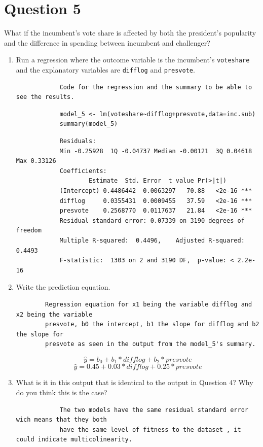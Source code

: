 \documentclass[12pt,letterpaper]{article}
\begin{document}
\section*{Question 5}
\noindent What if the incumbent's vote share is affected by both the president's popularity and the difference in spending between incumbent and challenger? 
	\begin{enumerate}
		\item Run a regression where the outcome variable is the incumbent's \texttt{voteshare} and the explanatory variables are \texttt{difflog} and \texttt{presvote}.
		\begin{verbatim}
			Code for the regression and the summary to be able to see the results.
		\end{verbatim}
		\begin{lstlisting}
			model_5 <- lm(voteshare~difflog+presvote,data=inc.sub)
			summary(model_5)
		\end{lstlisting}
		\begin{verbatim}
			Residuals: 
			Min -0.25928  1Q -0.04737 Median -0.00121  3Q 0.04618  Max 0.33126 
			Coefficients:             
		            Estimate  Std. Error  t value Pr(>|t|)   
			(Intercept) 0.4486442  0.0063297   70.88   <2e-16 ***
			difflog     0.0355431  0.0009455   37.59   <2e-16 ***
			presvote    0.2568770  0.0117637   21.84   <2e-16 ***
			Residual standard error: 0.07339 on 3190 degrees of freedom
			Multiple R-squared:  0.4496,	Adjusted R-squared:  0.4493 
			F-statistic:  1303 on 2 and 3190 DF,  p-value: < 2.2e-16
		\end{verbatim}
		\item Write the prediction equation.
		\begin{verbatim}
		Regression equation for x1 being the variable difflog and x2 being the variable
		presvote, b0 the intercept, b1 the slope for difflog and b2 the slope for
		presvote as seen in the output from the model_5's summary.
		\end{verbatim}
			\begin{equation}
			\hat{y} = b_0 + b_1*difflog + b_2*presvote
		\end{equation}
		\begin{equation}
			\hat{y} = 0.45 + 0.03*difflog + 0.25*presvote
		\end{equation}
		\item What is it in this output that is identical to the output in Question 4? Why do you think this is the case?
		\begin{verbatim}
			The two models have the same residual standard error wich means that they both 
			have the same level of fitness to the dataset , it could indicate multicolinearity. 
		\end{verbatim}
	\end{enumerate}
\end{document}
